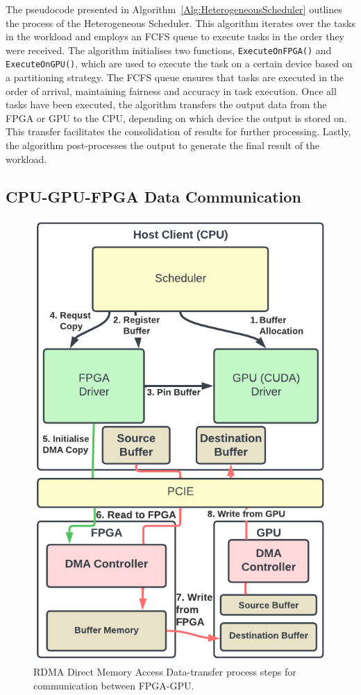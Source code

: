 The pseudocode presented in Algorithm~\ref{Alg:HeterogeneousScheduler} outlines the process of the Heterogeneous Scheduler. This algorithm iterates over the tasks in the workload and employs an FCFS queue to execute tasks in the order they were received. The algorithm initialises two functions, \texttt{ExecuteOnFPGA()} and \texttt{ExecuteOnGPU()}, which are used to execute the task on a certain device based on a partitioning strategy. The FCFS queue ensures that tasks are executed in the order of arrival, maintaining fairness and accuracy in task execution. Once all tasks have been executed, the algorithm transfers the output data from the FPGA or GPU to the CPU, depending on which device the output is stored on. This transfer facilitates the consolidation of results for further processing. Lastly, the algorithm post-processes the output to generate the final result of the workload. 



\subsection{CPU-GPU-FPGA Data Communication}

\begin{figure}[tb]
\centering
 \includegraphics[width=0.55\columnwidth]{Images/Scheduler.png}
   \caption[Data-Transfer on Heterogeneous Architecture]{RDMA Direct Memory Access Data-transfer process steps for communication between FPGA-GPU.}
   \label{fig:Scheduler}
\end{figure}

